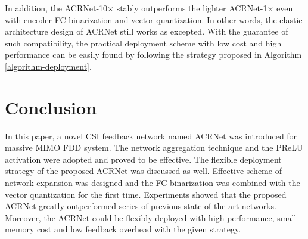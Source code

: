 \documentclass[12pt, draftclsnofoot, onecolumn]{IEEEtran}
\begin{document}
In addition, the ACRNet-10$\times$ stably outperforms the lighter ACRNet-1$\times$ even with encoder FC binarization and vector quantization. In other words, the elastic architecture design of ACRNet still works as excepted. With the guarantee of such compatibility, the practical deployment scheme with low cost and high performance can be easily found by following the strategy proposed in Algorithm \ref{algorithm-deployment}.


\ifCLASSOPTIONcaptionsoff
  \newpage
\fi

\section{Conclusion} \label{Section6}
In this paper, a novel CSI feedback network named ACRNet was introduced for massive MIMO FDD system. The network aggregation technique and the PReLU activation were adopted and proved to be effective. The flexible deployment strategy of the proposed ACRNet was discussed as well. Effective scheme of network expansion was designed and the FC binarization was combined with the vector quantization for the first time. Experiments showed that the proposed ACRNet greatly outperformed series of previous state-of-the-art networks. Moreover, the ACRNet could be flexibly deployed with high performance, small memory cost and low feedback overhead with the given strategy.







\end{document}
